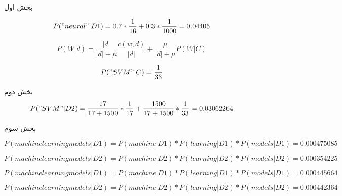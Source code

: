 \begin{boxC}
    بخش اول
    
    \begin{equation*}
        P("neural" | D1) = 0.7 * \frac{1}{16} + 0.3 * \frac{1}{1000} = 0.04405
    \end{equation*}

    \begin{center}
    \end{center}

    \begin{equation*}
        P(W | d) = 
        \frac{\lvert d \rvert}{\lvert d \rvert + \mu} \frac{c(w , d)}{\lvert d \rvert}
        + 
        \frac{\mu}{\lvert d \rvert + \mu} P(W | C)
    \end{equation*}

    \begin{equation*}
        P("SVM" | C) = \frac{1}{33}
    \end{equation*}

    بخش دوم
    \begin{equation*}
        P("SVM" | D2) = \frac{17}{17 + 1500} * \frac{1}{17} + \frac{1500}{17 + 1500} * \frac{1}{33} = 0.03062264
    \end{equation*}
\end{boxC}

\begin{boxE}
    بخش سوم 

    \newline
    \begin{equation*}
        P(machine learning models | D1) =
        P(machine | D1) * P(learning | D1) * P(models | D1) = 0.000475085
    \end{equation*}

    \begin{equation*}
        P(machine learning models | D2) =
        P(machine | D2) * P(learning | D2) * P(models | D2) = 0.000354225
    \end{equation*}


    \begin{equation*}
        P(machine learning models | D1) =
        P(machine | D1) * P(learning | D1) * P(models | D1) = 0.000445664
    \end{equation*}

    \begin{equation*}
        P(machine learning models | D2) =
        P(machine | D2) * P(learning | D2) * P(models | D2) = 0.000442364
    \end{equation*}
\end{boxE}

